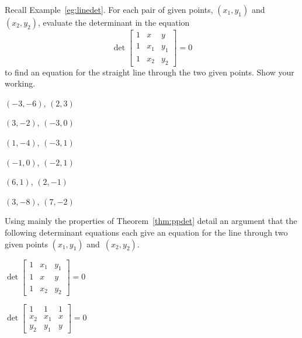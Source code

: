 \begin{exercise} \label{ex:} 
Recall Example~\ref{eg:linedet}.
For each pair of given points, \((x_1,y_1)\) and~\((x_2,y_2)\), evaluate the determinant in the equation
\begin{equation*}
\det\begin{bmatrix} 1 &x&y\\1&x_1&y_1\\1&x_2&y_2 \end{bmatrix}=0
\end{equation*}
to find an equation for the straight line through the two given points.
Show your working.
\begin{parts}
\item \((-3,-6)\), \((2,3)\)

\item \((3,-2)\), \((-3,0)\)

\item \((1,-4)\), \((-3,1)\)

\item \((-1,0)\), \((-2,1)\)

\item \((6,1)\), \((2,-1)\)

\item \((3,-8)\), \((7,-2)\)

\end{parts}
\end{exercise}




\begin{exercise} \label{ex:} 
Using mainly the properties of Theorem~\ref{thm:ppdet} detail an argument that the following determinant equations each give an equation for the line through two given points \((x_1,y_1)\) and~\((x_2,y_2)\).
\begin{parts}
\item \(\det\begin{bmatrix} 1&x_1&y_1
\\1&x&y
\\1&x_2&y_2 \end{bmatrix}=0\)

\item \(\det\begin{bmatrix} 1&1&1
\\x_2&x_1&x
\\y_2&y_1&y \end{bmatrix}=0\)

\end{parts}
\end{exercise}





